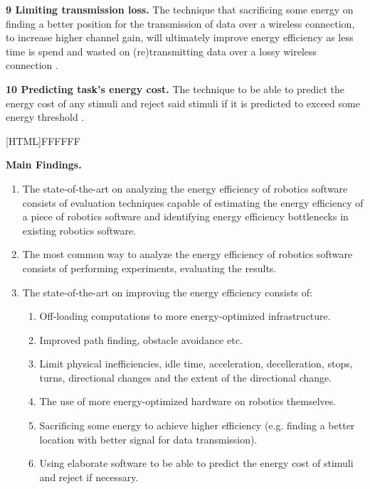 \vspace{1mm}

\textbf{9 Limiting transmission loss.} The technique that sacrificing some energy on finding a better position for the transmission of data over a wireless connection,
to increase higher channel gain, will ultimately improve energy efficiency as less time is spend and wasted on (re)transmitting 
data over a lossy wireless connection \cite{licea2013wireless_comms}.

\vspace{1mm}

\textbf{10 Predicting task's energy cost.} The technique to be able to predict the energy cost of any stimuli and reject said stimuli if it is predicted to exceed some energy threshold 
\cite{kirtay2013humanoid_emotion}.

\vspace{2mm}

\noindent{}[HTML]{FFFFFF}{\parbox{0.47\textwidth}{%
\noindent \textbf{Main Findings.}
\begin{enumerate}[nolistsep]
\item The state-of-the-art on analyzing the energy efficiency of robotics software consists of evaluation techniques capable of
estimating the energy efficiency of a piece of robotics software and identifying energy efficiency bottlenecks in existing robotics software.
\item The most common way to analyze the energy efficiency of robotics software consists of performing experiments, evaluating the results.
\item The state-of-the-art on improving the energy efficiency consists of:
    \begin{enumerate}
        \item Off-loading computations to more energy-optimized infrastructure.
        \item Improved path finding, obstacle avoidance etc.
        \item Limit physical inefficiencies, idle time, acceleration, decelleration, stops, turns, directional changes and the extent of the directional change.
        \item The use of more energy-optimized hardware on robotics themselves.
        \item Sacrificing some energy to achieve higher efficiency (e.g. finding a better location with better signal for data transmission).
        \item Using elaborate software to be able to predict the energy cost of stimuli and reject if necessary.
    \end{enumerate}
\end{enumerate}}}

